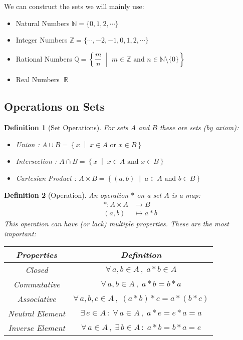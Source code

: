 \documentclass[12pt]{article}
\newcommand{\set}[2]{\left\{{#1}\;\middle|\;{#2}\right\}}
\newcommand{\Forall}[1]{\forall\,{#1}\,,\;}
\newcommand{\Exist}[1]{\exists\,{#1}\,:\;}
\DeclareMathOperator{\R}{\mathbb{R}}
\newtheorem{definition}{Definition}[subsection]
\begin{document}
We can construct the sets we will mainly use:

\begin{itemize}
  \item [] Natural Numbers $\mathbb{N}=\{0,1,2,\cdots\}$
  \item [] Integer Numbers $\mathbb{Z}=\{\cdots,-2,-1,0,1,2,\cdots\}$
  \item [] Rational Numbers $\mathbb{Q}=\set{\dfrac{m}{n}}{m\in\mathbb{Z}\text{ and }n\in\mathbb{N}\setminus\{0\}}$
  \item [] Real Numbers $\R$
\end{itemize}

\subsection{Operations on Sets}

\begin{definition}[Set Operations]
  For sets $A$ and $B$ these are sets (by axiom):
  \begin{itemize}
    \item[] Union : $A\cup B=\set{x}{x\in A \text{ or } x\in B}$
    \item[] Intersection : $A\cap B=\set{x}{x\in A \text{ and } x\in B}$
    \item[] Cartesian Product : $A\times B=\set{(a,b)}{a\in A \text{ and } b\in B}$
  \end{itemize}
\end{definition}

\begin{definition}[Operation]
  An operation $*$ on a set $A$ is a map:
  \begin{align*}
    *: A\times A&\to B\\
    (a,b)&\mapsto a*b
  \end{align*}
  This operation can have (or lack) multiple properties. These are the most important:
  \begin{table}[H]
    \centering
    \begin{tabular}{|c|c|}\hline
      Properties & Definition \\\hline
      Closed & $\Forall{a,b\in A} a*b\in A$\\\hline
      Commutative & $\Forall{a,b\in A} a*b=b*a$\\\hline
      Associative & $\Forall{a,b,c\in A} (a*b)*c=a*(b*c)$\\\hline
      Neutral Element & $\Exist{e\in A}\Forall{a\in A}a*e=e*a=a$\\\hline
      Inverse Element & $\Forall{a\in A}\Exist{b\in A} a*b=b*a=e$\\\hline
    \end{tabular}
  \end{table} 
\end{definition}
\end{document}
